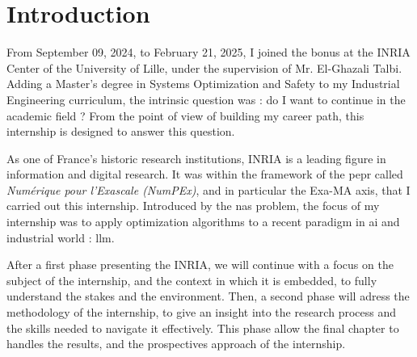 \chapter*{Introduction}

From September 09, 2024, to February 21, 2025, I joined the \acrfull{bonus} at the INRIA Center of the University of Lille, under the supervision of Mr. El-Ghazali Talbi. Adding a Master's degree in Systems Optimization and Safety to my Industrial Engineering curriculum, the intrinsic question was : do I want to continue in the academic field ? From the point of view of building my career path, this internship is designed to answer this question.

As one of France's historic research institutions, INRIA is a leading figure in information and digital research. It was within the framework of the \acrfull{pepr} called \textit{Numérique pour l'Exascale (NumPEx)}, and in particular the Exa-MA axis, that I carried out this internship. Introduced by the \acrfull{nas} problem, the focus of my internship was to apply optimization algorithms to a recent paradigm in \acrfull{ai} and industrial world : \acrfull{llm}.

After a first phase presenting the INRIA, we will continue with a focus on the subject of the internship, and the context in which it is embedded, to fully understand the stakes and the environment. Then, a second phase will adress the methodology of the internship, to give an insight into the research process and the skills needed to navigate it effectively. This phase allow the final chapter to handles the results, and the prospectives approach of the internship.

